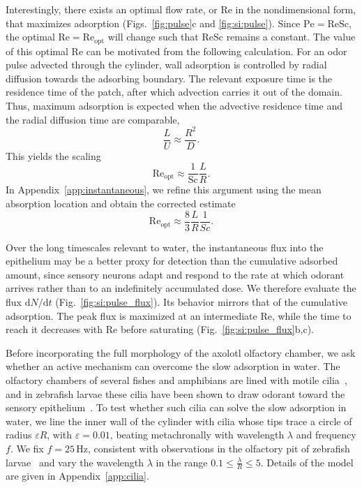 \documentclass[%
 twocolumn,
 amsmath,amssymb,
 aps,prfluids,
 superscriptaddress,
]{revtex4-2}
\newcommand{\Sc}{\mathrm{Sc}}
\newcommand{\Rey}{\mathrm{Re}}
\newcommand{\diff}{\mathrm{d}}
\begin{document}
Interestingly, there exists an optimal flow rate, or $\Rey$ in the nondimensional form, that maximizes adsorption (Figs.~\ref{fig:pulse}c and \ref{fig:si:pulse}). Since $\mathrm{Pe}=\Rey\Sc$, the optimal $\Rey=\Rey_\mathrm{opt}$ will change such that $\Rey\Sc$ remains a constant. The value of this optimal $\Rey$ can be motivated from the following calculation. For an odor pulse advected through the cylinder, wall adsorption is controlled by radial diffusion towards the adsorbing boundary. The relevant exposure time is the residence time of the patch, after which advection carries it out of the domain. Thus, maximum adsorption is expected when the advective residence time and the radial diffusion time are comparable,
\begin{equation}
\frac{L}{U}\approx \frac{R^2}{D}.
\end{equation}
This yields the scaling
\begin{equation}
\Rey_{\mathrm{opt}}\approx \frac{1}{\Sc}\frac{L}{R}.
\end{equation}
In Appendix~\ref{app:instantaneous}, we refine this argument using the mean absorption location and obtain the corrected estimate
\begin{equation}
\Rey_{\mathrm{opt}}\approx \frac{8}{3}\frac{L}{R}\frac{1}{Sc}.
\end{equation}

Over the long timescales relevant to water, the instantaneous flux into the epithelium may be a better proxy for detection than the cumulative adsorbed amount, since sensory neurons adapt and respond to the rate at which odorant arrives rather than to an indefinitely accumulated dose. We therefore evaluate the flux $\diff N/\diff t$ (Fig.~\ref{fig:si:pulse_flux}). Its behavior mirrors that of the cumulative adsorption. The peak flux is maximized at an intermediate $\Rey$, while the time to reach it decreases with $\Rey$ before saturating (Fig.~\ref{fig:si:pulse_flux}b,c).

Before incorporating the full morphology of the axolotl olfactory chamber, we ask whether an active mechanism can overcome the slow adsorption in water. The olfactory chambers of several fishes and amphibians are lined with motile cilia~\cite{reiten2017motile,ringers2023novel,ringers2019role,cox2013ciliary}, and in zebrafish larvae these cilia have been shown to draw odorant toward the sensory epithelium~\cite{reiten2017motile,ringers2023novel}. To test whether such cilia can solve the slow adsorption in water, we line the inner wall of the cylinder with cilia whose tips trace a circle of radius $\varepsilon R$, with $\varepsilon = 0.01$, beating metachronally with wavelength $\lambda$ and frequency $f$. We fix $f=25$\,Hz, consistent with observations in the olfactory pit of zebrafish larvae~\cite{reiten2017motile} and vary the wavelength $\lambda$ in the range $0.1 \leq \frac{\lambda}{R} \leq 5$. Details of the model are given in Appendix~\ref{app:cilia}.
\end{document}
